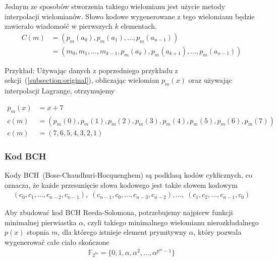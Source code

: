 Jednym ze sposobów stworzenia takiego wielomianu jest użycie metody interpolacji
wielomianów. Słowo kodowe wygenerowane z tego wielomianu będzie zawierało wiadomość
w pierwszych $k$ elementach.
\begin{align*}
    C(m) &= (p_m(a_0), p_m(a_1), \ldots, p_m(a_{n-1})) \\
         &= (m_0, m_1, \ldots, m_{k-1}, p_m(a_k), p_m(a_{k+1}), \ldots, p_m(a_{n-1}))
\end{align*}
\begin{minipage}{\textwidth}
Przykład:
\newline
Używając danych z poprzedniego przykładu z sekcji~(\ref{subsection:original}),
obliczając wielomian $p_m(x)$ oraz używając interpolacji Lagrange, otrzymujemy
\end{minipage}
\begin{align*}
    p_m(x) &= x + 7 \\
    c(m) &= (p_m(0), p_m(1), p_m(2), p_m(3), p_m(4), p_m(5), p_m(6), p_m(7)) \\
    c(m) &= (7, 6, 5, 4, 3, 2, 1)
\end{align*}

\subsubsection{Kod BCH}\label{subsubsection:bch}

Kody BCH~(Bose-Chaudhuri-Hocquenghem) są podklasą kodów cyklicznych, co oznacza, że każde przesunięcie słowa kodowego jest także słowem kodowym
\begin{align*}
    (c_0, c_1,\ldots, c_{n-2}, c_{n-1}), \;
    (c_{n-1}, c_0, \ldots, c_{n-3}, c_{n-2}),\ldots, \;
    (c_1, c_2, \ldots, c_{n-1}, c_{0})
\end{align*}

Aby zbudować kod BCH Reeda-Solomona, potrzebujemy najpierw funkcji minimalnej pierwiastka $\alpha$, czyli takiego minimalnego wielomianu nierozkładalnego $p(x)$ stopnia $m$, dla którego istnieje element prymitywny $\alpha$, który pozwala wygenerować całe ciało skończone
\begin{align*}
    \mathbb{F}_{2^m} = \{0, 1, \alpha, \alpha^2, \ldots, \alpha^{p^{m}-1} \}
\end{align*}

